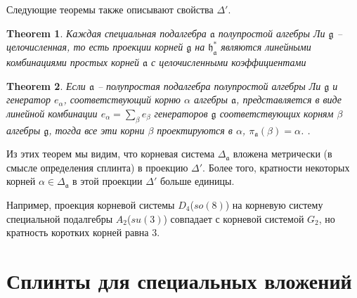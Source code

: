 \documentclass[12pt]{article}
\newtheorem{theorem}{Theorem}
\newcommand{\pia}{\pi_{\mathfrak{a}}}
\newcommand{\gf}{\mathfrak{g}}
\newcommand{\af}{\mathfrak{a}}
\newcommand{\hf}{\mathfrak{h}}
\newcommand{\hfa}{\hf_{\af}}
\begin{document}
Следующие теоремы \cite{dynkin1952semisimpleru} также описывают свойства  $\Delta'$. 

\begin{theorem}\label{dyn1}
  Каждая специальная подалгебра  $\af$ полупростой алгебры Ли  $\gf$ -- целочисленная, то есть
  проекции корней  $\gf$ на $\hfa^{*}$ являются линейными комбинациями простых корней  $\af$ с
  целочисленными коэффициентами \cite{dynkin1952semisimpleru}
\end{theorem}

\begin{theorem}\label{dyn2}
  Если $\af$  -- полупростая подалгебра полупростой алгебры Ли $\gf$ и генератор $e_{\alpha}$,
  соответствующий корню $\alpha$ алгебры $\af$, представляется в виде линейной комбинации  $e_{\alpha}=\sum_{\beta}
  e_{\beta}$ генераторов $\gf$ соответствующих корням  $\beta$ алгебры $\gf$, тогда все эти корни
  $\beta$ проектируются в  $\alpha$,
  $\pia(\beta)=\alpha$. 
  \cite{dynkin1972semisimple,dynkin1952semisimpleru}. 
\end{theorem}

Из этих теорем мы видим, что  корневая система $\Delta_{\af}$ вложена метрически (в смысле
определения сплинта) в проекцию  $\Delta'$. Более того, кратности некоторых корней 
$\alpha\in\Delta_{\af}$ в этой проекции  $\Delta'$ больше единицы. 

Например, проекция корневой системы $D_{4}$($so(8)$) на корневую систему специальной подалгебры
$A_{2}$($su(3)$) совпадает с корневой системой $G_{2}$, но кратность коротких корней равна $3$.



\section{Сплинты для специальных вложений}
\label{sec:splints-spec-embedd}

\end{document}
